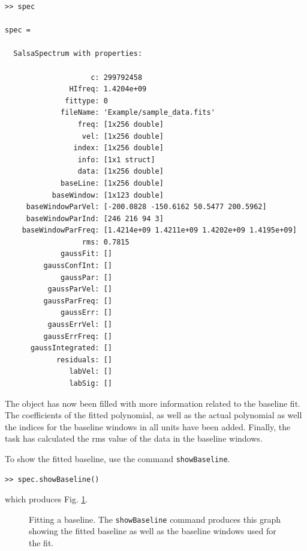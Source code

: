 \documentclass[11pt,a4paper]{article}
\begin{document}
\begin{lstlisting}
>> spec

spec = 

  SalsaSpectrum with properties:

                    c: 299792458
               HIfreq: 1.4204e+09
              fittype: 0
             fileName: 'Example/sample_data.fits'
                 freq: [1x256 double]
                  vel: [1x256 double]
                index: [1x256 double]
                 info: [1x1 struct]
                 data: [1x256 double]
             baseLine: [1x256 double]
           baseWindow: [1x123 double]
     baseWindowParVel: [-200.0828 -150.6162 50.5477 200.5962]
     baseWindowParInd: [246 216 94 3]
    baseWindowParFreq: [1.4214e+09 1.4211e+09 1.4202e+09 1.4195e+09]
                  rms: 0.7815
             gaussFit: []
         gaussConfInt: []
             gaussPar: []
          gaussParVel: []
         gaussParFreq: []
             gaussErr: []
          gaussErrVel: []
         gaussErrFreq: []
      gaussIntegrated: []
            residuals: []
               labVel: []
               labSig: []

\end{lstlisting}

The object has now been filled with more information related to the
baseline fit. The coefficients of the fitted polynomial, as well as
the actual polynomial as well the indices for the baseline windows in
all units have been added. Finally, the task has calculated the rms
value of the data in the baseline windows.

To show the fitted baseline, use the command \texttt{showBaseline}.
\begin{lstlisting}
>> spec.showBaseline()
\end{lstlisting}
which produces Fig. \ref{fig:baseline-fitted}.
\begin{figure}[h!]
  \centering
  \caption{Fitting a baseline. The \texttt{showBaseline} command
    produces this graph showing the fitted baseline as well as the
    baseline windows used for the fit. 
\label{fig:baseline-fitted}
}
\end{figure}
\end{document}
